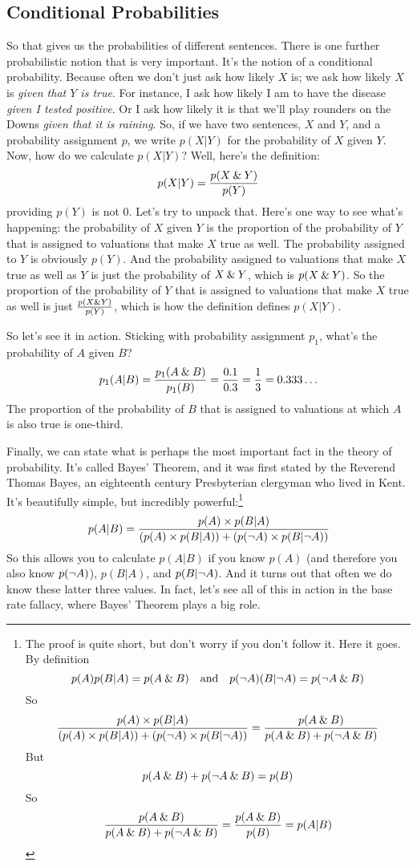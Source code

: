 \subsection{Conditional Probabilities}
So that gives us the probabilities of different sentences. There is one further probabilistic notion that is very important. It's the notion of a conditional probability. Because often we don't just ask how likely $X$ is; we ask how likely $X$ is \emph{given that $Y$ is true}. For instance, I ask how likely I am to have the disease \emph{given I tested positive}. Or I ask how likely it is that we'll play rounders on the Downs \emph{given that it is raining}. So, if we have two sentences, $X$ and $Y$, and a probability assignment $p$, we write $p(X | Y)$ for the probability of $X$ given $Y$. Now, how do we calculate $p(X |Y)$? Well, here's the definition:
\[
p(X | Y) = \frac{p(X\mathbin{\&} Y)}{p(Y)}
\]
providing $p(Y)$ is not 0. Let's try to unpack that. Here's one way to see what's happening: the probability of $X$ given $Y$ is the proportion of the probability of $Y$ that is assigned to valuations that make $X$ true as well. The probability assigned to $Y$ is obviously $p(Y)$. And the probability assigned to valuations that make $X$ true as well as $Y$ is just the probability of $X \mathbin{\&} Y$, which is $p(X \mathbin{\&} Y)$. So the proportion of the probability of $Y$ that is assigned to valuations that make $X$ true as well is just $\frac{p(X\mathbin{\&} Y)}{p(Y)}$, which is how the definition defines $p(X | Y)$.

So let's see it in action. Sticking with probability assignment $p_1$, what's the probability of $A$ given $B$?
\[
p_1(A | B) = \frac{p_1(A\mathbin{\&} B)}{p_1(B)} = \frac{0.1}{0.3} = \frac{1}{3} = 0.333\ldots
\]
The proportion of the probability of $B$ that is assigned to valuations at which $A$ is also true is one-third.

Finally, we can state what is perhaps the most important fact in the theory of probability. It's called Bayes' Theorem, and it was first stated by the Reverend Thomas Bayes, an eighteenth century Presbyterian clergyman who lived in Kent. It's beautifully simple, but incredibly powerful:\footnote{The proof is quite short, but don't worry if you don't follow it. Here it goes. By definition 
\[
p(A) p(B|A) = p(A\mathbin{\&} B) \mbox{\ \ \ and\ \ \ } p(\neg A)(B | \neg A) = p(\neg A\mathbin{\&} B)
\]
So
\[
\frac{p(A) \times p(B|A)}{(p(A) \times p(B|A)) + (p(\neg A)\times p(B|\neg A))} = \frac{p(A\mathbin{\&} B)}{p(A\mathbin{\&} B) + p(\neg A\mathbin{\&} B)}
\]
But
\[
p(A\mathbin{\&} B) + p(\neg A\mathbin{\&} B) = p(B)
\]
So
\[
\frac{p(A\mathbin{\&} B)}{p(A\mathbin{\&} B) + p(\neg A\mathbin{\&} B)} = \frac{p(A\mathbin{\&} B)}{p(B)} = p(A|B)
\]
}
\[
p(A | B) = \frac{p(A) \times p(B|A)}{(p(A) \times p(B|A)) + (p(\neg A)\times p(B|\neg A))}
\]
So this allows you to calculate $p(A|B)$ if you know $p(A)$ (and therefore you also know $p(\neg A)$), $p(B|A)$, and $p(B | \neg A)$. And it turns out that often we do know these latter three values. In fact, let's see all of this in action in the base rate fallacy, where Bayes' Theorem plays a big role.

